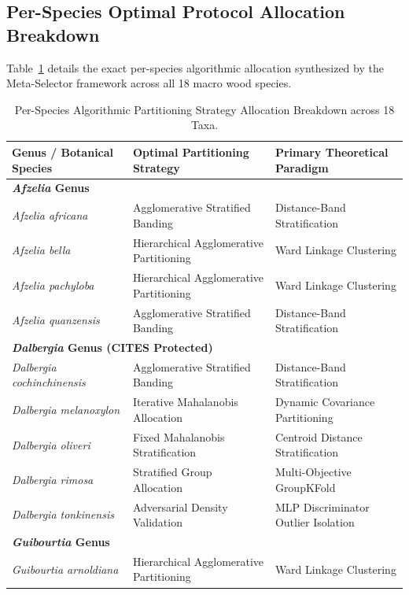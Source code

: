\subsection{Per-Species Optimal Protocol Allocation Breakdown}
Table~\ref{tab:species_breakdown} details the exact per-species algorithmic allocation synthesized by the Meta-Selector framework across all 18 macro wood species.

\begin{table}[htbp]
\centering
\caption{Per-Species Algorithmic Partitioning Strategy Allocation Breakdown across 18 Taxa.}
\label{tab:species_breakdown}
\small
\begin{tabular}{l l l}
\toprule
\textbf{Genus / Botanical Species} & \textbf{Optimal Partitioning Strategy} & \textbf{Primary Theoretical Paradigm} \\
\midrule
\multicolumn{3}{l}{\textbf{\textit{Afzelia} Genus}} \\
\quad \textit{Afzelia africana}      & Agglomerative Stratified Banding & Distance-Band Stratification \\
\quad \textit{Afzelia bella}          & Hierarchical Agglomerative Partitioning & Ward Linkage Clustering \\
\quad \textit{Afzelia pachyloba}      & Hierarchical Agglomerative Partitioning & Ward Linkage Clustering \\
\quad \textit{Afzelia quanzensis}     & Agglomerative Stratified Banding & Distance-Band Stratification \\
\midrule
\multicolumn{3}{l}{\textbf{\textit{Dalbergia} Genus (CITES Protected)}} \\
\quad \textit{Dalbergia cochinchinensis} & Agglomerative Stratified Banding & Distance-Band Stratification \\
\quad \textit{Dalbergia melanoxylon}    & Iterative Mahalanobis Allocation & Dynamic Covariance Partitioning \\
\quad \textit{Dalbergia oliveri}        & Fixed Mahalanobis Stratification & Centroid Distance Stratification \\
\quad \textit{Dalbergia rimosa}         & Stratified Group Allocation & Multi-Objective GroupKFold \\
\quad \textit{Dalbergia tonkinensis}    & Adversarial Density Validation & MLP Discriminator Outlier Isolation \\
\midrule
\multicolumn{3}{l}{\textbf{\textit{Guibourtia} Genus}} \\
\quad \textit{Guibourtia arnoldiana}     & Hierarchical Agglomerative Partitioning & Ward Linkage Clustering \\

\end{tabular}
\end{table}
